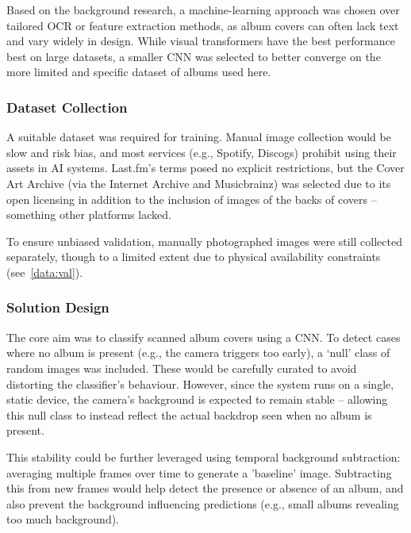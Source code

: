             Based on the background research, a machine-learning approach was chosen over tailored OCR or feature extraction methods, as album covers can often lack text and vary widely in design. While visual transformers have the best performance best on large datasets, a smaller CNN was selected to better converge on the more limited and specific dataset of albums used here.
        
            \subsubsection{Dataset Collection}
    
                A suitable dataset was required for training. Manual image collection would be slow and risk bias, and most services (e.g., Spotify, Discogs) prohibit using their assets in AI systems. Last.fm’s terms posed no explicit restrictions, but the Cover Art Archive (via the Internet Archive and Musicbrainz) was selected due to its open licensing in addition to the inclusion of images of the backs of covers -- something other platforms lacked.
    
                To ensure unbiased validation, manually photographed images were still collected separately, though to a limited extent due to physical availability constraints (see~\ref{data:val}).
    
            \subsubsection{Solution Design}
    
                The core aim was to classify scanned album covers using a CNN. To detect cases where no album is present (e.g., the camera triggers too early), a ‘null’ class of random images was included. These would be carefully curated to avoid distorting the classifier’s behaviour. However, since the system runs on a single, static device, the camera’s background is expected to remain stable -- allowing this null class to instead reflect the actual backdrop seen when no album is present.
    
                This stability could be further leveraged using temporal background subtraction: averaging multiple frames over time to generate a 'baseline' image. Subtracting this from new frames would help detect the presence or absence of an album, and also prevent the background influencing predictions (e.g., small albums revealing too much background).
    
